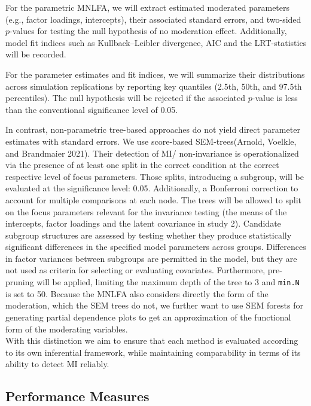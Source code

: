 \documentclass[
  man,
  floatsintext]{apa7}
\begin{document}
For the parametric MNLFA, we will extract estimated moderated parameters
(e.g., factor loadings, intercepts), their associated standard errors,
and two-sided \(p\)-values for testing the null hypothesis of no
moderation effect. Additionally, model fit indices such as
Kullback--Leibler divergence, AIC and the LRT-statistics will be
recorded.

For the parameter estimates and fit indices, we will summarize their
distributions across simulation replications by reporting key quantiles
(2.5th, 50th, and 97.5th percentiles). The null hypothesis will be
rejected if the associated \(p\)-value is less than the conventional
significance level of 0.05.

In contrast, non-parametric tree-based approaches do not yield direct
parameter estimates with standard errors. We use score-based
SEM-trees(Arnold, Voelkle, and Brandmaier 2021). Their detection of MI/
non-invariance is operationalized via the presence of at least one split
in the correct condition at the correct respective level of focus
parameters. Those splits, introducing a subgroup, will be evaluated at
the significance level: 0.05. Additionally, a Bonferroni correction to
account for multiple comparisons at each node. The trees will be allowed
to split on the focus parameters relevant for the invariance testing
(the means of the intercepts, factor loadings and the latent covariance
in study 2). Candidate subgroup structures are assessed by testing
whether they produce statistically significant differences in the
specified model parameters across groups. Differences in factor
variances between subgroups are permitted in the model, but they are not
used as criteria for selecting or evaluating covariates. Furthermore,
pre-pruning will be applied, limiting the maximum depth of the tree to 3
and \texttt{min.N} is set to 50. Because the MNLFA also considers
directly the form of the moderation, which the SEM trees do not, we
further want to use SEM forests for generating partial dependence plots
to get an approximation of the functional form of the moderating
variables.\\
With this distinction we aim to ensure that each method is evaluated
according to its own inferential framework, while maintaining
comparability in terms of its ability to detect MI reliably.

\subsection{Performance Measures}\label{performance-measures}
\end{document}
